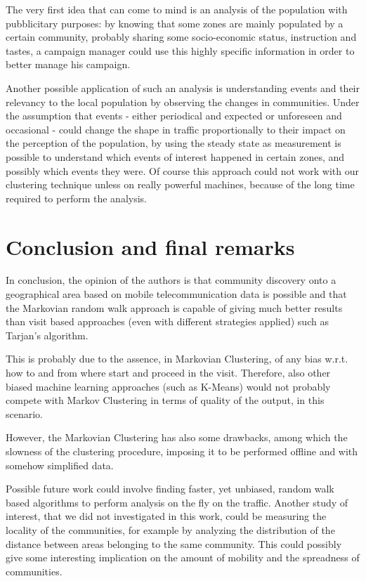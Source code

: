 \documentclass[12pt,a4paper]{article}
\begin{document}
The very first idea that can come to mind is an analysis of the population with pubblicitary purposes: by knowing that some zones are mainly populated by a certain community, probably sharing some socio-economic status, instruction and tastes, a campaign manager could use this highly specific information in order to better manage his campaign.

Another possible application of such an analysis is understanding events and their relevancy to the local population by observing the changes in communities. Under the assumption that events - either periodical and expected or unforeseen and occasional - could change the shape in traffic proportionally to their impact on the perception of the population, by using the steady state as measurement is possible to understand which events of interest happened in certain zones, and possibly which events they were.
Of course this approach could not work with our clustering technique unless on really powerful machines, because of the long time required to perform the analysis.
\newpage

\section{Conclusion and final remarks}

In conclusion, the opinion of the authors is that community discovery
onto a geographical area based on mobile telecommunication data
is possible and that the Markovian random walk approach is capable of giving much better
results than visit based approaches (even with different strategies applied) such as Tarjan's algorithm. 

This is probably due to the assence, in Markovian Clustering, of any bias w.r.t. how to and from where start
and proceed in the visit. Therefore, also other biased machine learning
approaches (such as K-Means) would not probably compete with Markov
Clustering in terms of quality of the output, in this scenario.

However, the Markovian Clustering has also some drawbacks, among which the slowness of the clustering procedure,
imposing it to be performed offline and with somehow simplified data. 

Possible future work could involve finding faster, yet unbiased, random walk based algorithms to perform
analysis on the fly on the traffic. Another study of interest, that we did not investigated in this work, could be
measuring the locality of the communities, for example by analyzing the distribution of the distance between areas
belonging to the same community.
This could possibly give some interesting implication on the amount of mobility and the spreadness of communities.
\newpage
\end{document}
